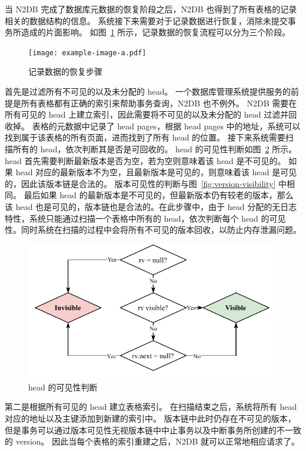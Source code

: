 当 N2DB 完成了数据库元数据的恢复阶段之后，N2DB 也得到了所有表格的记录相关的数据结构的信息。
系统接下来需要对于记录数据进行恢复，消除未提交事务所造成的片面影响。
如图~\ref{fig:record-recovery} 所示，记录数据的恢复流程可以分为三个阶段。

\begin{figure}[ht]
    \centering
    \texttt{[image: example-image-a.pdf]}
    \caption{记录数据的恢复步骤}
    \label{fig:record-recovery}
\end{figure}

首先是过滤所有不可见的以及未分配的 head。
一个数据库管理系统提供服务的前提是所有表格都有正确的索引来帮助事务查询，N2DB 也不例外。
N2DB 需要在所有可见的 head 上建立索引，因此需要将不可见的以及未分配的 head 过滤并回收掉。
表格的元数据中记录了 head pages，根据 head pages 中的地址，系统可以找到属于该表格的所有页面，进而找到了所有 head 的位置。
接下来系统需要扫描所有的 head，依次判断其是否是可回收的。
head 的可见性判断如图~\ref{fig:head-visibility} 所示。
head 首先需要判断最新版本是否为空，若为空则意味着该 head 是不可见的。
如果 head 对应的最新版本不为空，且最新版本是可见的，则意味着该 head 是可见的，因此该版本链是合法的。
版本可见性的判断与图~\ref{fig:version-visibility} 中相同。
最后如果 head 的最新版本是不可见的，但最新版本仍有较老的版本，那么该 head 也是可见的，版本链也是合法的。在此步骤中，由于 head 分配的无日志特性，系统只能通过扫描一个表格中所有的 head，依次判断每个 head 的可见性。同时系统在扫描的过程中会将所有不可见的版本回收，以防止内存泄漏问题。

\begin{figure}[ht]
    \centering
    \includegraphics[width=1\linewidth]{figures/head_visibility.pdf}
    \caption{head 的可见性判断}
    \label{fig:head-visibility}
\end{figure}

第二是根据所有可见的 head 建立表格索引。
在扫描结束之后，系统将所有 head 对应的地址以及主键添加到新建的索引中。
版本链中此时仍存在不可见的版本，但是事务可以通过版本可见性无视版本链中中止事务以及中断事务所创建的不一致的 version。
因此当每个表格的索引重建之后，N2DB 就可以正常地相应请求了。


